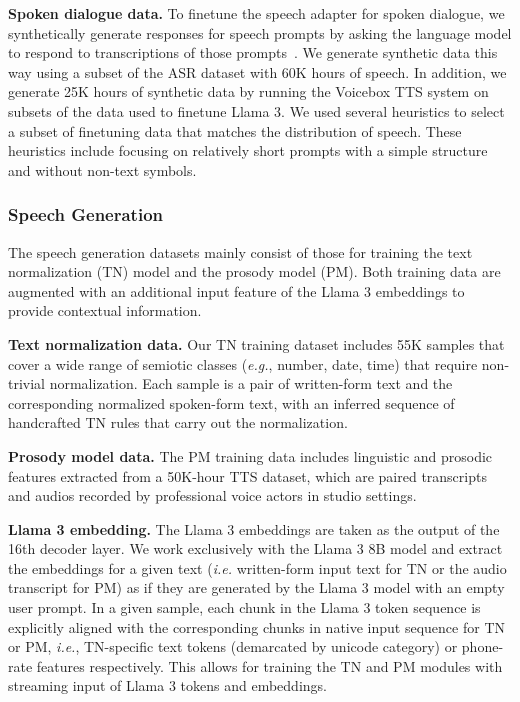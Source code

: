 \documentclass[dvipsnames]{fairmeta}
\begin{document}
\textbf{Spoken dialogue data.}
To finetune the speech adapter for spoken dialogue, we synthetically generate responses for speech prompts by asking the language model to respond to transcriptions of those prompts~\citep{fathullah2024audiochatllama}.
We generate synthetic data this way using a subset of the ASR dataset with 60K hours of speech.
In addition, we generate 25K hours of synthetic data by running the Voicebox TTS system \citep{le2024voicebox} on subsets of the data used to finetune Llama 3.
We used several heuristics to select a subset of finetuning data that matches the distribution of speech.
These heuristics include focusing on relatively short prompts with a simple structure and without non-text symbols.

\subsubsection{Speech Generation}
\label{sec:data:tts}
The speech generation datasets mainly consist of those for training the text normalization (TN) model and the prosody model (PM).  Both training data are augmented with an additional input feature of the Llama 3 embeddings to provide contextual information.

\textbf{Text normalization data.} Our TN training dataset includes 55K samples that cover a wide range of semiotic classes (\emph{e.g.}, number, date, time) that require non-trivial normalization. Each sample is a pair of written-form text and the corresponding normalized spoken-form text, with an inferred sequence of handcrafted TN rules that carry out the normalization.

\textbf{Prosody model data.} The PM training data includes linguistic and prosodic features extracted from a 50K-hour TTS dataset, which are paired transcripts and audios recorded by professional voice actors in studio settings.

\textbf{Llama 3 embedding.}
The Llama 3 embeddings are taken as the output of the 16th decoder layer. We work exclusively with the Llama 3 8B model and extract the embeddings for a given text (\emph{i.e.} written-form input text for TN or the audio transcript for PM) as if they are generated by the Llama 3 model with an empty user prompt. In a given sample, each chunk in the Llama 3 token sequence is explicitly aligned with the corresponding chunks in native input sequence for TN or PM, \emph{i.e.}, TN-specific text tokens (demarcated by unicode category) or phone-rate features respectively. This allows for training the TN and PM modules with streaming input of Llama 3 tokens and embeddings.
\end{document}

